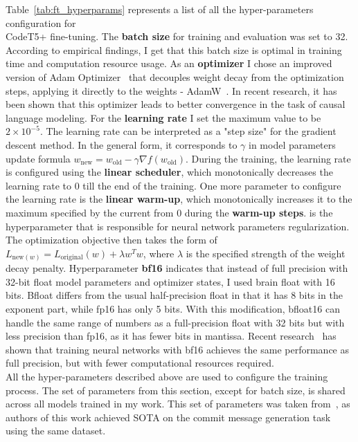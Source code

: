 Table~\ref{tab:ft_hyperparams} represents a list of all the hyper-parameters configuration for \\ CodeT5+ fine-tuning. The \textbf{batch size} for training and evaluation was set to 32. According to empirical findings, I get that this batch size is optimal in training time and computation resource usage. As an \textbf{optimizer} I chose an improved version of Adam Optimizer~\cite{kingma2014adam} that decouples weight decay from the optimization steps, applying it directly to the weights - AdamW~\cite{loshchilov2017decoupled}. In recent research, it has been shown that this optimizer leads to better convergence in the task of causal language modeling. For the \textbf{learning rate} I set the maximum value to be $2 \times 10^{-5}$. The learning rate can be interpreted as a "step size" for the gradient descent method. In the general form, it corresponds to $\gamma$ in model parameters update formula $w_{\text{new}} = w_{\text{old}} - \gamma \nabla f(w_{\text{old}})$. During the training, the learning rate is configured using the \textbf{linear scheduler}, which monotonically decreases the learning rate to 0 till the end of the training. One more parameter to configure the learning rate is the \textbf{linear warm-up}, which monotonically increases it to the maximum specified by the current from 0 during the \textbf{warm-up steps}.  is the hyperparameter that is responsible for neural network parameters regularization. The optimization objective then takes the form of $L_{\text{new}(w)} = L_{\text{original}}(w) + \lambda w^Tw$, where $\lambda$ is the specified strength of the weight decay penalty. Hyperparameter \textbf{bf16} indicates that instead of full precision with 32-bit float model parameters and optimizer states, I used brain float with 16 bits. Bfloat differs from the usual half-precision float in that it has 8 bits in the exponent part, while fp16 has only 5 bits. With this modification, bfloat16 can handle the same range of numbers as a full-precision float with 32 bits but with less precision than fp16, as it has fewer bits in mantissa. Recent research~\cite{kalamkar2019study} has shown that training neural networks with bf16 achieves the same performance as full precision, but with fewer computational resources required.  \\
All the hyper-parameters described above are used to configure the training  process. The set of parameters from this section, except for batch size, is shared across all models trained in my work. This set of parameters was taken from~\cite{eliseeva2023commit}, as authors of this work achieved SOTA on the commit message generation task using the same dataset.

